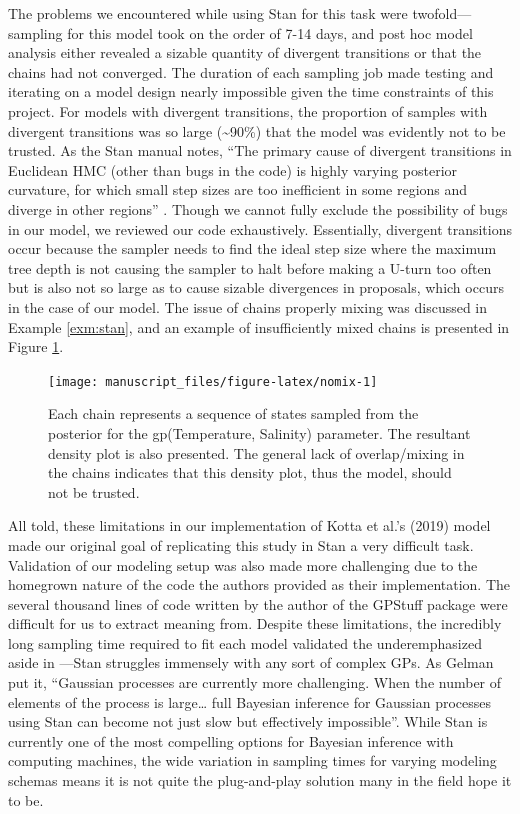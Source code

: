 \documentclass[
  12pt,
  oneside]{book}
\theoremstyle{definition}
\theoremstyle{definition}
\theoremstyle{definition}
\theoremstyle{remark}
\begin{document}
The problems we encountered while using Stan for this task were twofold---sampling for this model took on the order of 7-14 days, and post hoc model analysis either revealed a sizable quantity of divergent transitions or that the chains had not converged.
The duration of each sampling job made testing and iterating on a model design nearly impossible given the time constraints of this project.
For models with divergent transitions, the proportion of samples with divergent transitions was so large (\textasciitilde90\%) that the model was evidently not to be trusted.
As the Stan manual notes, ``The primary cause of divergent transitions in Euclidean HMC (other than bugs in the code) is highly varying posterior curvature, for which small step sizes are too inefficient in some regions and diverge in other regions'' \citep{StanManual2016}.
Though we cannot fully exclude the possibility of bugs in our model, we reviewed our code exhaustively.
Essentially, divergent transitions occur because the sampler needs to find the ideal step size where the maximum tree depth is not causing the sampler to halt before making a U-turn too often but is also not so large as to cause sizable divergences in proposals, which occurs in the case of our model.
The issue of chains properly mixing was discussed in Example \ref{exm:stan}, and an example of insufficiently mixed chains is presented in Figure \ref{fig:nomix}.

\begin{figure}

{\centering \texttt{[image: manuscript\_files/figure-latex/nomix-1]} 

}

\caption{Each chain represents a sequence of states sampled from the posterior for the gp(Temperature, Salinity) parameter. The resultant density plot is also presented. The general lack of overlap/mixing in the chains indicates that this density plot, thus the model, should not be trusted.}\label{fig:nomix}
\end{figure}

All told, these limitations in our implementation of Kotta et al.'s (2019) model made our original goal of replicating this study in Stan a very difficult task.
Validation of our modeling setup was also made more challenging due to the homegrown nature of the code the authors provided as their implementation.
The several thousand lines of code written by the author of the GPStuff package were difficult for us to extract meaning from.
Despite these limitations, the incredibly long sampling time required to fit each model validated the underemphasized aside in \citet{Gelman2015}---Stan struggles immensely with any sort of complex GPs.
As Gelman put it, ``Gaussian processes are currently more challenging. When the number of elements of the process is large\ldots{} full Bayesian inference for Gaussian processes using Stan can become not just slow but effectively impossible''.
While Stan is currently one of the most compelling options for Bayesian inference with computing machines, the wide variation in sampling times for varying modeling schemas means it is not quite the plug-and-play solution many in the field hope it to be.
\end{document}
